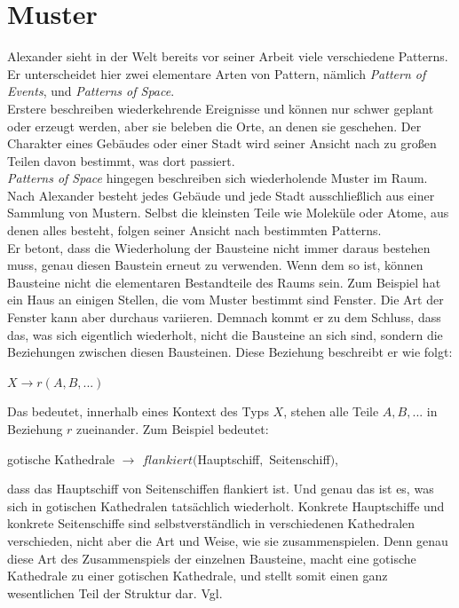 \documentclass[fontsize=11pt,a4paper,final]{scrreprt}[2003/01/01]
\begin{document}
\section{Muster}
Alexander sieht in der Welt bereits vor seiner Arbeit viele verschiedene Patterns. Er unterscheidet hier zwei elementare Arten von Pattern, nämlich \textit{Pattern of Events}, und \textit{Patterns of Space}. \\
Erstere beschreiben wiederkehrende Ereignisse und können nur schwer geplant oder erzeugt werden, aber sie beleben die Orte, an denen sie geschehen. Der Charakter eines Gebäudes oder einer Stadt wird seiner Ansicht nach zu großen Teilen davon bestimmt, was dort passiert.  \\
\textit{Patterns of Space} hingegen beschreiben sich wiederholende Muster im Raum. Nach Alexander besteht jedes Gebäude und jede Stadt ausschließlich aus einer Sammlung von Mustern. Selbst die kleinsten Teile wie Moleküle oder Atome, aus denen alles besteht, folgen seiner Ansicht nach bestimmten Patterns. \\ 
Er betont, dass die Wiederholung der Bausteine nicht immer daraus bestehen muss, genau diesen Baustein erneut zu verwenden. Wenn dem so ist, können Bausteine nicht die elementaren Bestandteile des Raums sein. Zum Beispiel hat ein Haus an einigen Stellen, die vom Muster bestimmt sind Fenster. Die Art der Fenster kann aber durchaus variieren. Demnach kommt er zu dem Schluss, dass das, was sich eigentlich wiederholt, nicht die Bausteine an sich sind, sondern die Beziehungen zwischen diesen Bausteinen. Diese Beziehung beschreibt er wie folgt:
\begin{center}
	$ X \rightarrow r(A, B, ...) $
\end{center}
Das bedeutet, innerhalb eines Kontext des Typs $X$, stehen alle Teile $A, B, ...$ in Beziehung $r$ zueinander. Zum Beispiel bedeutet:
\begin{center}
	gotische Kathedrale $\rightarrow$ $flankiert($Hauptschiff$,$ Seitenschiff$)$,
\end{center}
dass das Hauptschiff von Seitenschiffen flankiert ist. Und genau das ist es, was sich in gotischen Kathedralen tatsächlich wiederholt. Konkrete Hauptschiffe und konkrete Seitenschiffe sind selbstverständlich in verschiedenen Kathedralen verschieden, nicht aber die Art und Weise, wie sie zusammenspielen. Denn genau diese Art des Zusammenspiels der einzelnen Bausteine, macht eine gotische Kathedrale zu einer gotischen Kathedrale, und stellt somit einen ganz wesentlichen Teil der Struktur dar. Vgl. \cite[S. 55 - 122]{Alexander1979}
\end{document}
